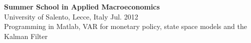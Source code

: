 \documentclass[margin,line]{resume}
\begin{document}
\begin{resume}
%   
%   
%
%
        \textbf{Summer School in Applied Macroeconomics}\\
        University of Salento, Lecce, Italy \hfill Jul. 2012\\
        Programming in Matlab,  VAR for monetary policy, state space models and the Kalman Filter

 



 \newpage	
 



\end{resume}
\end{document}
